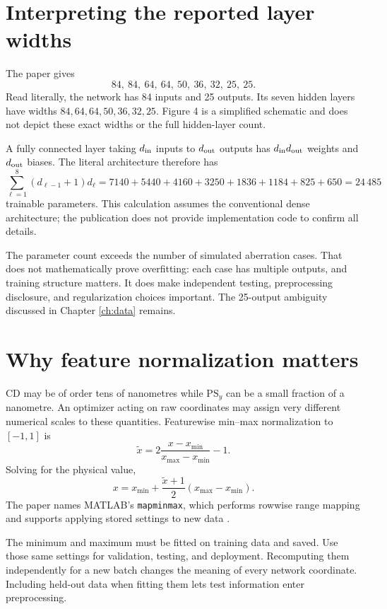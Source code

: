\section{Interpreting the reported layer widths}
The paper gives
\[
84,\ 84,\ 64,\ 64,\ 50,\ 36,\ 32,\ 25,\ 25.
\]
Read literally, the network has 84 inputs and 25 outputs. Its seven
hidden layers have widths $84,64,64,50,36,32,25$.
Figure 4 is a simplified schematic and does not depict these exact widths
or the full hidden-layer count.

A fully connected layer taking $d_{\rm in}$ inputs to $d_{\rm out}$
outputs has $d_{\rm in}d_{\rm out}$ weights and $d_{\rm out}$ biases.
The literal architecture therefore has
\[
\sum_{\ell=1}^8(d_{\ell-1}+1)d_\ell
=7140+5440+4160+3250+1836+1184+825+650
=24\,485
\]
trainable parameters. This calculation assumes the conventional dense
architecture; the publication does not provide implementation code to
confirm all details.

The parameter count exceeds the number of simulated aberration cases.
That does not mathematically prove overfitting: each case has multiple
outputs, and training structure matters. It does make independent testing,
preprocessing disclosure, and regularization choices important.
The 25-output ambiguity discussed in Chapter \ref{ch:data} remains.

\section{Why feature normalization matters}
CD may be of order tens of nanometres while $\mathrm{PS}_y$ can be a small
fraction of a nanometre. An optimizer acting on raw coordinates may assign
very different numerical scales to these quantities.
Featurewise min--max normalization to $[-1,1]$ is
\begin{equation}
\widetilde x=2\frac{x-x_{\min}}{x_{\max}-x_{\min}}-1.
\label{eq:normalization}
\end{equation}
Solving for the physical value,
\begin{equation}
x=x_{\min}+\frac{\widetilde x+1}{2}(x_{\max}-x_{\min}).
\label{eq:unnormalization}
\end{equation}
The paper names MATLAB's \texttt{mapminmax}, which performs rowwise
range mapping and supports applying stored settings to new data
\cite{mapminmax}.

The minimum and maximum must be fitted on training data and saved.
Use those same settings for validation, testing, and deployment.
Recomputing them independently for a new batch changes the meaning
of every network coordinate. Including held-out data when fitting them
lets test information enter preprocessing.

